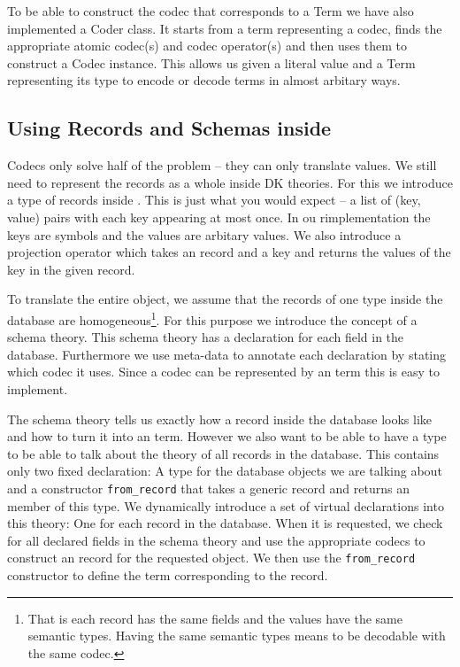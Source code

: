 \documentclass{deliverablereport}
\begin{document}
To be able to construct the codec that corresponds to a Term we have also implemented a Coder class. It starts from a term representing a codec, finds the appropriate atomic codec(s) and codec operator(s) and then uses them to construct a Codec instance. This allows us given a literal value  and a Term representing its type to encode or decode terms in almost arbitary ways.

\subsection{Using Records and Schemas inside \MMT}

Codecs only solve half of the problem -- they can only translate values. We still need to represent the records as a whole inside DK theories. For this we introduce a type of records inside \MMT. This is just what you would expect -- a list of (key, value) pairs with each key appearing at most once. In ou rimplementation the keys are \MMT symbols and the values are arbitary \MMT values. We also introduce a projection operator which takes an \MMT record and a key and returns the values of the key in the given record.

To translate the entire object, we assume that the records of one type inside the database are homogeneous\footnote{That is each record has the same fields and the values have the same semantic types. Having the same semantic types means to be decodable with the same codec. }. For this purpose we introduce the concept of a schema theory. This schema theory has a declaration for each field in the database. Furthermore we use meta-data to annotate each declaration by stating which codec it uses. Since a codec can be represented by an \MMT term this is easy to implement.

The schema theory tells us exactly how a record inside the database looks like and how to turn it into an \MMT term. However we also want to be able to have a type to be able to talk about the theory of all records in the database. This contains only two fixed declaration: A type for the database objects we are talking about and a constructor \texttt{from\_record} that takes a generic record and returns an member of this type. We dynamically introduce a set of virtual declarations into this theory: One for each record in the database. When it is requested, we check for all declared fields in the schema theory and use the appropriate codecs to construct an \MMT record for the requested object. We then use the  \texttt{from\_record} constructor to define the \MMT term corresponding to the record.
\end{document}
